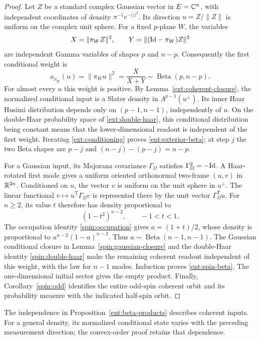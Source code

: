 \begin{proof}
Let $Z$ be a standard complex Gaussian vector in $E=\mathbb C^n$, with
independent coordinates of density $\pi^{-1}e^{-|z|^2}$. Its direction
$u=Z/\|Z\|$ is uniform on the complex unit sphere. For a fixed
$p$-plane $W$, the variables
\[
 X=\|\pi_W Z\|^2,\qquad
 Y=\|(\mathrm{Id}-\pi_W)Z\|^2
\]
are independent Gamma variables of shapes $p$ and $n-p$.
Consequently the first conditional weight is
\begin{equation}
 a_{\rho_W}(u)=\|\pi_Wu\|^2=\frac{X}{X+Y}
 \sim\operatorname{Beta}(p,n-p).
 \label{ent:first-exterior-weight}
\end{equation}
For almost every $u$ this weight is positive. By
Lemma~\ref{ext:coherent-closure}, the normalized conditional input
is a Slater density in $\Lambda^{p-1}(u^\perp)$. Its inner Haar
Husimi distribution depends only on $(p-1,n-1)$, independently of
$u$. On the double-Haar probability space of
\eqref{ext:double-haar}, this conditional distribution being constant
means that the lower-dimensional readout is independent of the first
weight. Iterating \eqref{ext:conditioning} proves
\eqref{ent:exterior-beta}; at step $j$ the two Beta shapes are
$p-j$ and $(n-j)-(p-j)=n-p$.

For a Gaussian input, its Majorana covariance $\Gamma_\Omega$
satisfies $\Gamma_\Omega^2=-\mathrm{Id}$. A Haar-rotated first mode gives
a uniform oriented orthonormal two-frame $(u,v)$ in $\mathbb R^{2n}$.
Conditioned on $u$, the vector $v$ is uniform on the unit sphere in
$u^\perp$. The linear functional $v\mapsto u^{\mathsf T}\Gamma_\Omega v$
is represented there by the unit vector $\Gamma_\Omega^{\mathsf T}u$.
For $n\ge2$, its value $t$ therefore has density proportional to
\[
 (1-t^2)^{n-2},\qquad -1<t<1.
\]
The occupation identity \eqref{spin:occupation} gives
$a=(1+t)/2$, whose density is proportional to
$a^{n-2}(1-a)^{n-2}$. Thus
$a\sim\operatorname{Beta}(n-1,n-1)$.
The Gaussian conditional closure in Lemma~\ref{spin:gaussian-closure}
and the double-Haar identity \eqref{spin:double-haar} make the
remaining coherent readout independent of this weight, with the
law for $n-1$ modes. Induction proves \eqref{ent:spin-beta}.
The one-dimensional initial sector gives the empty product.
Finally, Corollary~\ref{spin:odd} identifies the entire odd-spin
coherent orbit and its probability measure with the indicated
half-spin orbit.
\end{proof}

The independence in Proposition~\ref{ent:beta-products} describes
coherent inputs. For a general density, its normalized conditional
state varies with the preceding measurement direction; the convex-order
proof retains that dependence.

